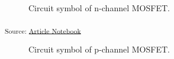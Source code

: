 \documentclass[
  a4paper,
  DIV=11,
  numbers=noendperiod]{scrartcl}
\begin{document}
\begin{figure}[H]


\caption{\label{fig-nmos-symbol}Circuit symbol of n-channel MOSFET.}

\end{figure}%

\textsubscript{Source:
\href{https://iic-jku.github.io/analog-circuit-design/index.qmd.html}{Article
Notebook}}

\begin{figure}[H]


\caption{\label{fig-pmos-symbol}Circuit symbol of p-channel MOSFET.}

\end{figure}%
\end{document}
